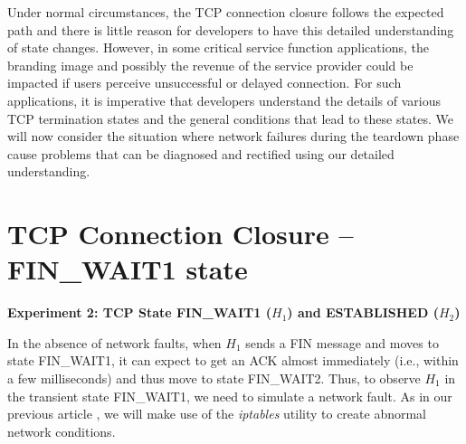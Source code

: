 \begin{multicols}{2}
Under normal circumstances, the TCP connection closure follows the expected path and there is little reason for developers to have this detailed understanding of state changes. However, in some critical service function applications, the branding image and possibly the revenue of the service provider could be impacted if users perceive unsuccessful or delayed connection. For such applications, it is imperative that developers understand the details of various TCP termination states and the general conditions that lead to these states. We will now consider the situation where network failures during the teardown phase cause problems that can be diagnosed and rectified using our detailed understanding.

\section*{TCP Connection Closure -- FIN\_WAIT1 state}

\noindent
\textbf{Experiment 2: TCP State FIN\_WAIT1 (\boldmath$H_{1}$) and ESTABLISHED ($H_{2}$)}
\smallskip

In the absence of network faults, when $H_{1}$ sends a FIN message and moves to state FIN\_WAIT1, it can expect to get an ACK almost immediately (i.e., within a few milliseconds) and thus move to state FIN\_WAIT2. Thus, to observe $H_{1}$ in the transient state FIN\_WAIT1, we need to simulate a network fault. As in our previous article \cite{chap3-key8}, we will make use of the \textit{iptables} utility to create abnormal network conditions.


\end{multicols}
